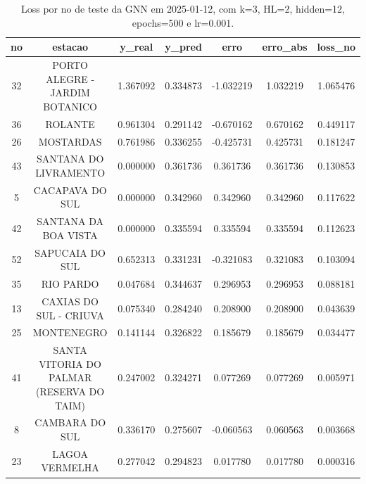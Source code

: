 \begin{table}[h]
\centering
\caption{Loss por no de teste da GNN em 2025-01-12, com k=3, HL=2, hidden=12, epochs=500 e lr=0.001.}
\label{tab:gnn_loss_k3_hl2_h12_e500_d20250112}
\begin{tabular}{ccccccc}
\toprule
no & estacao & y\_real & y\_pred & erro & erro\_abs & loss\_no \\
\midrule
32 & PORTO ALEGRE - JARDIM BOTANICO & 1.367092 & 0.334873 & -1.032219 & 1.032219 & 1.065476 \\
36 & ROLANTE & 0.961304 & 0.291142 & -0.670162 & 0.670162 & 0.449117 \\
26 & MOSTARDAS & 0.761986 & 0.336255 & -0.425731 & 0.425731 & 0.181247 \\
43 & SANTANA DO LIVRAMENTO & 0.000000 & 0.361736 & 0.361736 & 0.361736 & 0.130853 \\
5 & CACAPAVA DO SUL & 0.000000 & 0.342960 & 0.342960 & 0.342960 & 0.117622 \\
42 & SANTANA DA BOA VISTA & 0.000000 & 0.335594 & 0.335594 & 0.335594 & 0.112623 \\
52 & SAPUCAIA DO SUL & 0.652313 & 0.331231 & -0.321083 & 0.321083 & 0.103094 \\
35 & RIO PARDO & 0.047684 & 0.344637 & 0.296953 & 0.296953 & 0.088181 \\
13 & CAXIAS DO SUL - CRIUVA & 0.075340 & 0.284240 & 0.208900 & 0.208900 & 0.043639 \\
25 & MONTENEGRO & 0.141144 & 0.326822 & 0.185679 & 0.185679 & 0.034477 \\
41 & SANTA VITORIA DO PALMAR (RESERVA DO TAIM) & 0.247002 & 0.324271 & 0.077269 & 0.077269 & 0.005971 \\
8 & CAMBARA DO SUL & 0.336170 & 0.275607 & -0.060563 & 0.060563 & 0.003668 \\
23 & LAGOA VERMELHA & 0.277042 & 0.294823 & 0.017780 & 0.017780 & 0.000316 \\
\bottomrule
\end{tabular}
\end{table}

